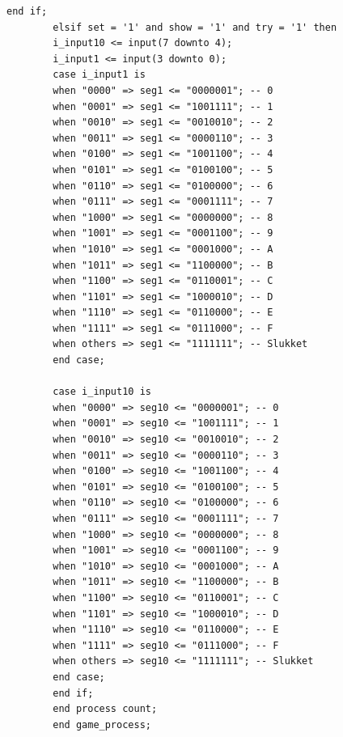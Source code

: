 \begin{enumerate}
\begin{lstlisting}[caption={Behavioral style kode for Guessgame},label={lst:Guessgame}]
		end if;
		elsif set = '1' and show = '1' and try = '1' then 
		i_input10 <= input(7 downto 4); 
		i_input1 <= input(3 downto 0);
		case i_input1 is
		when "0000" => seg1 <= "0000001"; -- 0
		when "0001" => seg1 <= "1001111"; -- 1
		when "0010" => seg1 <= "0010010"; -- 2
		when "0011" => seg1 <= "0000110"; -- 3
		when "0100" => seg1 <= "1001100"; -- 4
		when "0101" => seg1 <= "0100100"; -- 5
		when "0110" => seg1 <= "0100000"; -- 6
		when "0111" => seg1 <= "0001111"; -- 7
		when "1000" => seg1 <= "0000000"; -- 8
		when "1001" => seg1 <= "0001100"; -- 9
		when "1010" => seg1 <= "0001000"; -- A
		when "1011" => seg1 <= "1100000"; -- B
		when "1100" => seg1 <= "0110001"; -- C
		when "1101" => seg1 <= "1000010"; -- D
		when "1110" => seg1 <= "0110000"; -- E
		when "1111" => seg1 <= "0111000"; -- F
		when others => seg1 <= "1111111"; -- Slukket
		end case;
		
		case i_input10 is
		when "0000" => seg10 <= "0000001"; -- 0
		when "0001" => seg10 <= "1001111"; -- 1
		when "0010" => seg10 <= "0010010"; -- 2
		when "0011" => seg10 <= "0000110"; -- 3
		when "0100" => seg10 <= "1001100"; -- 4
		when "0101" => seg10 <= "0100100"; -- 5
		when "0110" => seg10 <= "0100000"; -- 6
		when "0111" => seg10 <= "0001111"; -- 7
		when "1000" => seg10 <= "0000000"; -- 8
		when "1001" => seg10 <= "0001100"; -- 9
		when "1010" => seg10 <= "0001000"; -- A
		when "1011" => seg10 <= "1100000"; -- B
		when "1100" => seg10 <= "0110001"; -- C
		when "1101" => seg10 <= "1000010"; -- D
		when "1110" => seg10 <= "0110000"; -- E
		when "1111" => seg10 <= "0111000"; -- F
		when others => seg10 <= "1111111"; -- Slukket
		end case;
		end if;
		end process count;
		end game_process;
		

\end{lstlisting}
\end{enumerate}
